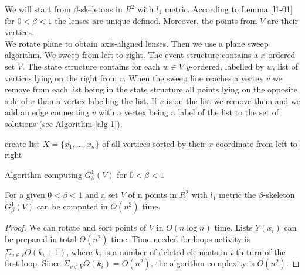 \documentclass[11pt]{llncs}
\begin{document}
We will start from $\beta$-skeletons in $R^2$ with $l_1$ metric. 
According to Lemma \ref{l1-01} for $0 < \beta < 1$ the lenses are unique defined. Moreover, 
the points from $V$ are their vertices. \\
We rotate plane to obtain axis-aligned lenses. Then we use a plane sweep algorithm.
We sweep from left to right. The event structure contains a $x$-ordered set $V$.
The state structure contains for each $w \in V$ $y$-ordered, labelled by $w$, list of vertices 
lying on the right from $v$. When the sweep line reaches a vertex $v$ we remove from each list being 
in the state structure all points lying on the opposite side of $v$ than a vertex labelling the list. 
If $v$ is on the list we remove them and we add an edge connecting $v$ with a vertex being a label 
of the list to the set of solutions (see Algorithm \ref{alg-1}). \\ 


\begin{algorithm}[H]
\footnotesize{
\BlankLine
create list $X=\{x_1, \ldots, x_n\}$ of all vertices sorted by their $x$-coordinate from left to right\;


}
\caption{Algorithm computing $G_{\beta}^1(V)$ for $0 < \beta < 1$ }
\label{alg-1} 
\end{algorithm}  

\begin{theorem}
For a given $0<\beta<1$ and a set $V$ of n points in $R^2$ with $l_1$ metric the $\beta$-skeleton
$G_{\beta}^1(V)$ can be computed in $O(n^2)$ time.
\end{theorem}
\begin{proof}
We can rotate and sort points of $V$ in $O(n \log n)$ time. Lists $Y(x_i)$ can be prepared 
in total $O(n^2)$ time. Time needed for loops activity is $\Sigma_{v \in V} O(k_i+1)$, where
$k_i$ is a number of deleted elements in $i$-th turn of the first loop. 
Since $\Sigma_{v \in V} O(k_i)=O(n^2)$, the algorithm complexity is $O(n^2)$.
\end{proof}
\end{document}
